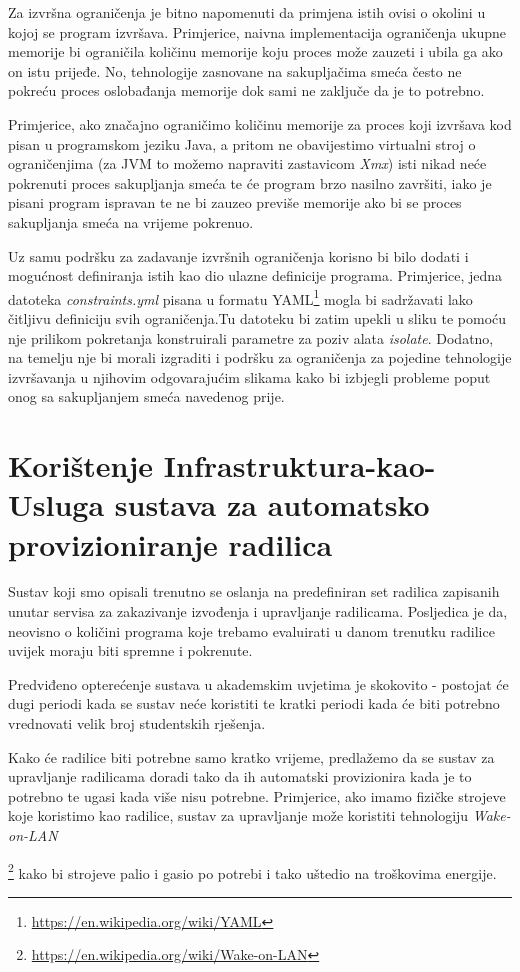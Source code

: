 \documentclass[times, utf8, zavrsni]{fer}
\begin{document}
{Za izvršna ograničenja je bitno napomenuti da primjena istih ovisi o okolini u kojoj se program izvršava. Primjerice, naivna implementacija ograničenja ukupne memorije bi ograničila količinu memorije koju proces može zauzeti i ubila ga ako on istu prijeđe. No, tehnologije zasnovane na sakupljačima smeća često ne pokreću proces oslobađanja memorije dok sami ne zaključe da je to potrebno.

Primjerice, ako značajno ograničimo količinu memorije za proces koji izvršava kod pisan u programskom jeziku Java, a pritom ne obavijestimo virtualni stroj o ograničenjima (za JVM to možemo napraviti zastavicom {\textit{Xmx}}) isti nikad neće pokrenuti proces sakupljanja smeća te će program brzo nasilno završiti, iako je pisani program ispravan te ne bi zauzeo previše memorije ako bi se proces sakupljanja smeća na vrijeme pokrenuo.

Uz samu podršku za zadavanje izvršnih ograničenja korisno bi bilo dodati i mogućnost definiranja istih kao dio ulazne definicije programa. Primjerice, jedna datoteka {\textit{constraints.yml}} pisana u formatu YAML\footnote{\url{https://en.wikipedia.org/wiki/YAML}} mogla bi sadržavati lako čitljivu definiciju svih ograničenja.Tu datoteku bi zatim upekli u sliku te pomoću nje prilikom pokretanja konstruirali parametre za poziv alata {\textit{isolate}}. Dodatno, na temelju nje bi morali izgraditi i podršku za ograničenja za pojedine tehnologije izvršavanja u njihovim odgovarajućim slikama kako bi izbjegli probleme poput onog sa sakupljanjem smeća navedenog prije.


\section{Korištenje Infrastruktura-kao-Usluga sustava za automatsko provizioniranje radilica}

Sustav koji smo opisali trenutno se oslanja na predefiniran set radilica zapisanih unutar servisa za zakazivanje izvođenja i upravljanje radilicama. Posljedica je da, neovisno o količini programa koje trebamo evaluirati u danom trenutku radilice uvijek moraju biti spremne i pokrenute.

Predviđeno opterećenje sustava u akademskim uvjetima je skokovito - postojat će dugi periodi kada se sustav neće koristiti te kratki periodi kada će biti potrebno vrednovati velik broj studentskih rješenja.

Kako će radilice biti potrebne samo kratko vrijeme, predlažemo da se sustav za upravljanje radilicama doradi tako da ih automatski provizionira kada je to potrebno te ugasi kada više nisu potrebne. Primjerice, ako imamo fizičke strojeve koje koristimo kao radilice, sustav za upravljanje može koristiti tehnologiju {\textit{Wake-on-LAN}}{\footnote{\url{https://en.wikipedia.org/wiki/Wake-on-LAN}} kako bi strojeve palio i gasio po potrebi i tako uštedio na troškovima energije.

}}
\end{document}

